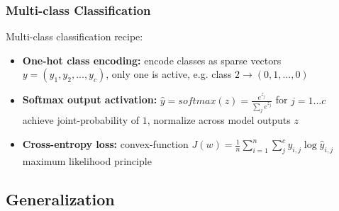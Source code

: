 \documentclass[aspectratio=169]{beamer}
\begin{document}
\begin{frame}
\frametitle{Multi-class Classification}

Multi-class classification recipe:
\medskip
\begin{itemize}
    \item \textbf{One-hot class encoding:} encode classes as sparse vectors \\
    $y=(y_1, y_2, ..., y_c)$, only one is active, e.g. class $2\rightarrow (0, 1, ..., 0)$
    \item \textbf{Softmax output activation:} $\hat{y}=softmax(z)=\frac{e^{z_{j}}}{\sum_{j}e^{z_{j}}}$ for $j=1...c$\\
    achieve joint-probability of $1$, normalize across model outputs $z$
    \item \textbf{Cross-entropy loss:} convex-function $J(w)=\frac{1}{n}\sum_{i=1}^{n}\sum_{j}^{c}y_{i,j}\log\hat{y}_{i,j}$\\
    maximum likelihood principle
\end{itemize}
\end{frame}

\subsection{Generalization}
\label{subsec:generalization}
\end{document}
